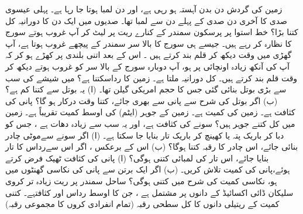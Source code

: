 زمین کی گردش دن بدن آہستہ ہو رہی ہے، اور دن لمبا ہوتا جا رہا ہے۔ پہلی عیسوی صدی کا آخری دن   صدی کے پہلے دن سے  لمبا  تھا۔  صدیوں میں ایک دن کا دورانیہ کل  کتنا بڑا؟
  خط استوا پر  پرسکون سمندر کے کنارے ریت پر لیٹ کر آپ  غروب ہوتے سورج کا نظارہ کر رہے ہیں۔ جیسے ہی سورج کا بالا  سر سمندر کے پیچھے غروب ہوتا ہے،  آپ گھڑی میں وقت دیکھ کر قلم بند کرتے ہیں ۔ اس کے بعد  اتنی بلندی پر کھڑے ہو کر کہ آپ کی آنکھ زیادہ اونچائی پر ہو،  آپ دوبارہ سورج کے بالا سر کو غروب ہوتے دیکھ کر وقت قلم بند کرتے ہیں۔ کل دورانیہ ملتا ہے۔ زمین کا رداسکتنا ہے؟ 
 میں شیشے کی سب سے بڑی بوتل بنائی گئی جس کا حجم امریکی  گیلن تھا۔ 
(ا) یہ   بوتل  سے کتنا کم ہے؟  (ب)  اگر  بوتل   کی شرح سے پانی سے بھری  جائے،  کتنا  وقت درکار ہو  گا؟  پانی کی کثافت ہے۔ 
زمین کی کمیت ہے۔ زمین کے  جوہر   (ایٹم) کی اوسط کمیت تقریباً   ہے۔ زمین میں کل کتنے  جوہر  ہیں؟ 
سونے کی کثافت ہے، اور یہ سب سے زیادہ  دھات ہے ، جس کو دبا کر باریک پتہ  یا کھینچ کر باریک تار بنایا  جا سکتا ہے۔ (ا) اگر سونے 
سےموٹی چادر بنائی جائے، اس چادر کا رقبہ کتنا ہوگا؟   (ب) اس کے برعکس ، اگر اس
 سےرداس کا  تار بنایا  جائے، اس تار کی لمبائی کتنی ہوگی؟ 
(ا)  پانی کی کثافت ٹھیک فرض کرتے ہوئے،پانی کی کمیت تلاش کریں۔ 
(ب) اگر ایک برتن سے پانی کی نکاسی گھنٹوں میں  ہو، نکاسی کمیت کی شرح میں  کتنی  ہوگی؟ 
 ساحل سمندر پر ریت زیادہ تر  کروی سلیکان ڈائی اکسائیڈ کے دانوں پر مشتمل ہے ، جن کا اوسط رداس اور 
 کثافتہے۔ کتنی کمیت کے ریتیلی دانوں کا کل سطحی رقبہ (تمام انفرادی کروں کا مجموعی رقبہ)
